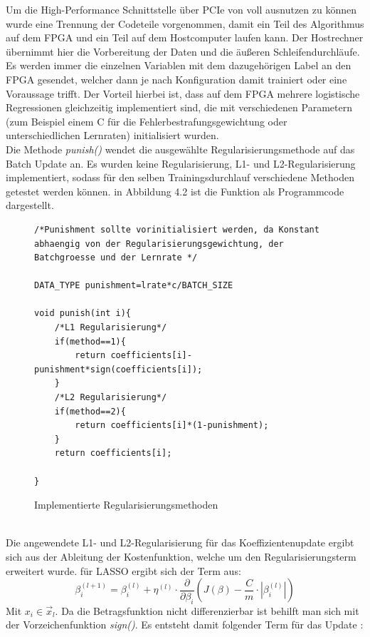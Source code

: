 Um die High-Performance Schnittstelle über PCIe von \cite{DILL} voll ausnutzen zu können wurde eine Trennung der Codeteile vorgenommen, damit ein Teil des Algorithmus auf dem FPGA und ein Teil auf dem Hostcomputer laufen kann. Der Hostrechner übernimmt hier die Vorbereitung der Daten und die äußeren Schleifendurchläufe. Es werden immer die einzelnen Variablen mit dem dazugehörigen Label an den FPGA gesendet, welcher dann je nach Konfiguration damit trainiert oder eine Voraussage trifft. Der Vorteil hierbei ist, dass auf dem FPGA mehrere logistische Regressionen gleichzeitig implementiert sind, die mit verschiedenen Parametern (zum Beispiel einem C für die Fehlerbestrafungsgewichtung oder unterschiedlichen Lernraten) initialisiert wurden.\\
Die Methode \textit{punish()} wendet die ausgewählte Regularisierungsmethode auf das Batch Update an. Es wurden keine Regularisierung, L1- und L2-Regularisierung implementiert, sodass für den selben Trainingsdurchlauf verschiedene Methoden getestet werden können. in Abbildung 4.2 ist die Funktion als Programmcode dargestellt.\\
\begin{figure}[ht]
\centering
\begin{lstlisting}
/*Punishment sollte vorinitialisiert werden, da Konstant abhaengig von der Regularisierungsgewichtung, der Batchgroesse und der Lernrate */

DATA_TYPE punishment=lrate*c/BATCH_SIZE

void punish(int i){
	/*L1 Regularisierung*/
	if(method==1){
		return coefficients[i]-punishment*sign(coefficients[i]);
	}
	/*L2 Regularisierung*/
	if(method==2){
		return coefficients[i]*(1-punishment);
	}
	return coefficients[i];
	    
}
\end{lstlisting}
\caption{Implementierte Regularisierungsmethoden}
\end{figure}\\
Die angewendete L1- und L2-Regularisierung für das Koeffizientenupdate ergibt sich aus der Ableitung der Kostenfunktion, welche um den Regularisierungsterm erweitert wurde.
für LASSO ergibt sich der Term aus:
\begin{displaymath}
\beta_i^{(l+1)}=\beta_i^{(l)}+\eta^{(l)} \cdot \dfrac{\partial}{\partial \beta_i} \left( J(\beta)-\frac{C}{m} \cdot | \beta_i^{(l)} |\right)
\end{displaymath}
Mit $x_i \in \vec x_l$. Da die Betragsfunktion nicht differenzierbar ist behilft man sich mit der Vorzeichenfunktion \textit{sign()}. Es entsteht damit folgender Term für das Update \cite{L1C}:
